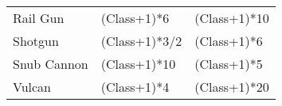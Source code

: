 \documentclass[twoside]{book}
\begin{document}
\begin{longtable}{p{1.25in}ll}
  \raggedright
           Rail Gun 
  &
   (Class+1)*6 
  &
   (Class+1)*10
           
  \tabularnewline
      
  \raggedright
           Shotgun 
  &
   (Class+1)*3/2 
  &
   (Class+1)*6
           
  \tabularnewline
      
  \raggedright
           Snub Cannon 
  &
   (Class+1)*10 
  &
   (Class+1)*5
           
  \tabularnewline
      
  \raggedright
           Vulcan 
  &
   (Class+1)*4 
  &
   (Class+1)*20
           
  \tabularnewline
      
\end{longtable}
    
\end{document}
